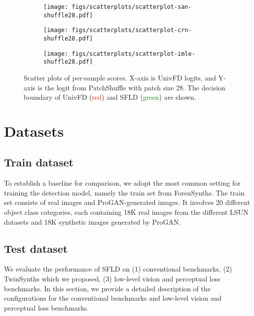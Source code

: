 \begin{figure*}[!ph]
\begin{subfigure}[b]{0.20\linewidth}
    \end{subfigure}
    \begin{subfigure}[b]{0.20\linewidth}
        \centering
        \texttt{[image: figs/scatterplots/scatterplot-san-shuffle28.pdf]}
    \end{subfigure}
    \begin{subfigure}[b]{0.20\linewidth}
        \centering
        \texttt{[image: figs/scatterplots/scatterplot-crn-shuffle28.pdf]}
    \end{subfigure}
    \begin{subfigure}[b]{0.20\linewidth}
        \centering
        \texttt{[image: figs/scatterplots/scatterplot-imle-shuffle28.pdf]}
    \end{subfigure}
     \caption{Scatter plots of per-sample scores. X-axis is UnivFD logits, and Y-axis is the logit from PatchShuffle with patch size 28. The decision boundary of UnivFD (\textcolor{red}{red}) and SFLD (\textcolor{green}{green}) are shown.}
     \vspace{-1em}
     \label{fig:additional-score-ensemble-viz}
     \vspace{-1em}
\end{figure*}
\twocolumn

\section{Datasets}
\label{supp:datasets}

\subsection{Train dataset}
To establish a baseline for comparison, we adopt the most common setting for training the detection model, namely the train set from ForenSynths\cite{wang2020cnn}. 
The train set consists of real images and ProGAN\cite{karras2018progressive}-generated images. It involves 20 different object class categories, each containing 18K real images from the different LSUN\cite{yu2015lsun} datasets and 18K synthetic images generated by ProGAN.

\subsection{Test dataset}
We evaluate the performance of SFLD on (1) conventional benchmarks, (2) TwinSynths which we proposed, (3) low-level vision and perceptual loss benchmarks. In this section, we provide a detailed description of the configurations for the conventional benchmarks and low-level vision and perceptual loss benchmarks.

